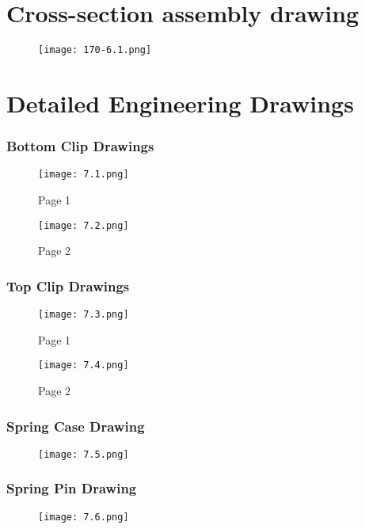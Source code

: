 \documentclass[12pt]{article}
\theoremstyle{definition} %
\theoremstyle{plain} %
\begin{document}
\section{Cross-section assembly drawing}
\begin{figure}[htbp]
  \centering
  \texttt{[image: 170-6.1.png]}
  \caption{}
  \label{fig:}
\end{figure}
\pagebreak

\section{Detailed Engineering Drawings}
\subsubsection*{Bottom Clip Drawings}
\begin{figure}[htbp]
  \centering
  \texttt{[image: 7.1.png]}
  \caption{Page 1}
  \label{fig:}
\end{figure}
\begin{figure}[htbp]
  \centering
  \texttt{[image: 7.2.png]}
  \caption{Page 2}
  \label{fig:}
\end{figure}
\pagebreak
\subsubsection*{Top Clip Drawings}
\begin{figure}[htbp]
  \centering
  \texttt{[image: 7.3.png]}
  \caption{Page 1}
  \label{fig:}
\end{figure}

\begin{figure}[htbp]
  \centering
  \texttt{[image: 7.4.png]}
  \caption{Page 2}
  \label{fig:}
\end{figure}

\pagebreak
\subsubsection*{Spring Case Drawing}
\begin{figure}[htbp]
  \centering
  \texttt{[image: 7.5.png]}
  \caption{}
  \label{fig:}
\end{figure}

\pagebreak
\subsubsection*{Spring Pin Drawing}
\begin{figure}[htbp]
  \centering
  \texttt{[image: 7.6.png]}
  \caption{}
  \label{fig:}
\end{figure}
\end{document}
